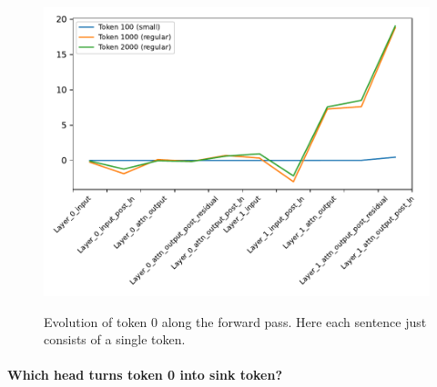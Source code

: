 \begin{figure}[H]
\begin{minipage}{.48\textwidth}
    \centering
    \label{fig:ph}
    \includegraphics[width=\textwidth]{Figures/initial_token/evolution_initial_token.pdf}
\end{minipage}
\caption{
\small
Evolution of token 0 along the forward pass. Here each sentence just consists of a single token.
}
\label{fig:special-neuron}
\vspace{-1em}
\end{figure}




\paragraph{Which head turns token 0 into sink token?}

